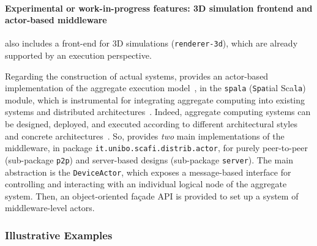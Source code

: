 \paragraph*{Experimental or work-in-progress features: 3D simulation frontend and actor-based middleware}
%
\scafi{} also includes a front-end for 3D simulations (\texttt{renderer-3d}), which are already supported by an execution perspective.

Regarding the construction of actual systems, 
 \scafi{}
 provides
 an actor-based implementation
 of the aggregate execution model~\cite{DBLP:series/lncs/CasadeiV18},
 in the \texttt{spala} (\texttt{Spa}tial Sca\texttt{la}) module,
 which is instrumental for integrating aggregate computing
 into existing systems and distributed architectures~\cite{DBLP:series/lncs/CasadeiV18}.
%
Indeed, aggregate computing systems
 can be designed, deployed, and executed 
 according to different
 architectural styles 
 and concrete architectures~\cite{DBLP:journals/fi/CasadeiPPVW20}.
%
So, \scafi{} provides \emph{two} main implementations of the middleware,
 in package \texttt{it.unibo.scafi.distrib.actor},
 for purely peer-to-peer 
 (sub-package \texttt{p2p})
 and server-based designs
 (sub-package \texttt{server}).
%
The main abstraction
 is the \texttt{DeviceActor},
 which exposes a message-based interface
 for controlling and interacting with
 an individual logical node of the aggregate system.
%
Then, an object-oriented façade API is provided to set up a system of middleware-level actors. 
%



\subsubsection{Illustrative Examples}
\label{sec:examples}


